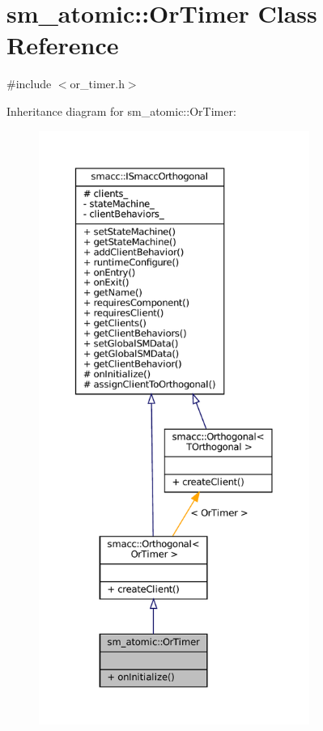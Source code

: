 \hypertarget{classsm__atomic_1_1OrTimer}{}\section{sm\+\_\+atomic\+:\+:Or\+Timer Class Reference}
\label{classsm__atomic_1_1OrTimer}


{\ttfamily \#include $<$or\+\_\+timer.\+h$>$}



Inheritance diagram for sm\+\_\+atomic\+:\+:Or\+Timer\+:
\nopagebreak
\begin{figure}[H]
\begin{center}
\leavevmode
\includegraphics[height=550pt]{classsm__atomic_1_1OrTimer__inherit__graph}
\end{center}
\end{figure}


